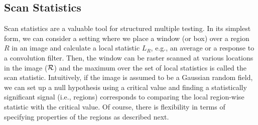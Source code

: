 \subsection{Scan Statistics}
Scan statistics are a valuable tool for structured multiple testing.
In its simplest form, we can consider a setting where we place a window (or box) over a region $R$ in an image and calculate 
a local statistic $L_R$, e.g., an average or a response to a convolution filter. 
Then, the window can be raster scanned at various locations in the image ($\mathcal{R}$) and the maximum 
over the set of local statistics is called the scan statistic. 
Intuitively, if the image is assumed to be a Gaussian random field, we can set up a null hypothesis using a
critical value and finding a statistically significant signal (i.e., regions) corresponds to comparing 
the local region-wise statistic with the critical value.  
Of course, there is flexibility in terms of specifying properties of the regions as described next. 
 
